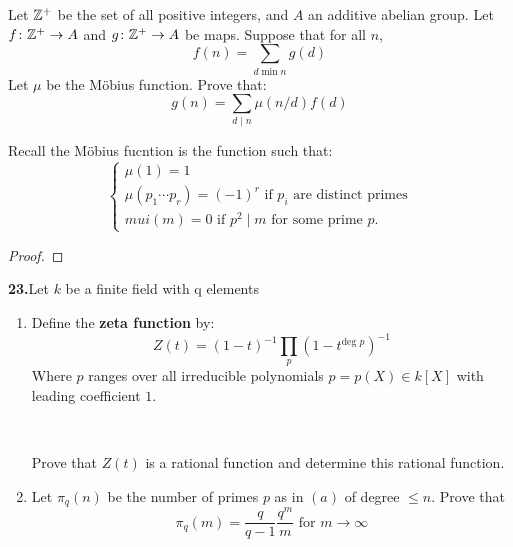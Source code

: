 \begin{exercise}
    Let $\mathbb{Z}^+$ be the set of all positive integers, and $A$ an additive abelian group. Let $f\colon \mathbb{Z}^+\rightarrow A$ and $g\colon \mathbb{Z}^+\rightarrow A$ be maps. Suppose that for all $n$,
    \[f(n) = \sum_{d\min n}g(d)\]
Let $\mu$ be the Möbius function. Prove that:\[g(n) = \sum_{d\mid n}\mu(n/d)f(d)\]

Recall the Möbius fucntion is the function such that:\[\begin{cases}
    \mu(1) = 1\\
    \mu(p_1\cdots p_r) = {(-1)}^r \text{ if }p_i\text{ are distinct primes}\\
    mui(m) = 0\text{ if }p^2\mid m\text{ for some prime }p.
\end{cases}\]
\begin{proof}
    
\end{proof}
\end{exercise}


\newpage
\textbf{23.}Let $k$ be a finite field with q elements\begin{enumerate}[label = (\alph*)]
    \item Define the \textbf{zeta function} by:\begin{equation}
        Z(t) = (1-t)^{-1}\prod_{p}(1-t^{\text{deg }p})^{-1}
    \end{equation}
    Where $p$ ranges over all irreducible polynomials $p=p(X)\in k[X]$ with leading coefficient $1$.
    
    \
    
    Prove that $Z(t)$ is a rational function and determine this rational function.
    
    \item Let $\pi_q(n)$ be the number of primes $p$ as in $(a)$ of degree $\leq n$. Prove that \begin{equation}
        \pi_q(m) = \frac{q}{q-1}\frac{q^m}{m} \text{ for }m\rightarrow\infty
    \end{equation}
\end{enumerate}
